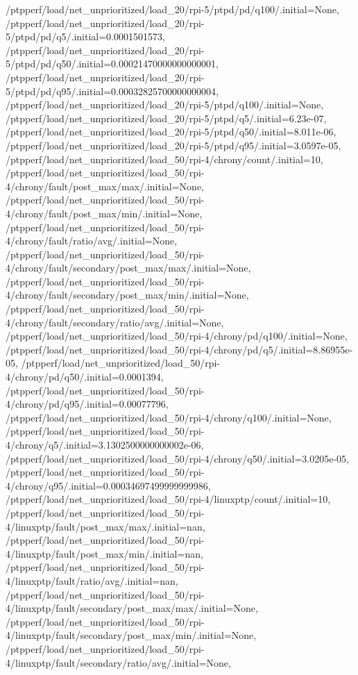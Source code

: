 {    /ptpperf/load/net_unprioritized/load_20/rpi-5/ptpd/pd/q100/.initial=None,
    /ptpperf/load/net_unprioritized/load_20/rpi-5/ptpd/pd/q5/.initial=0.0001501573,
    /ptpperf/load/net_unprioritized/load_20/rpi-5/ptpd/pd/q50/.initial=0.00021470000000000001,
    /ptpperf/load/net_unprioritized/load_20/rpi-5/ptpd/pd/q95/.initial=0.00032825700000000004,
    /ptpperf/load/net_unprioritized/load_20/rpi-5/ptpd/q100/.initial=None,
    /ptpperf/load/net_unprioritized/load_20/rpi-5/ptpd/q5/.initial=6.23e-07,
    /ptpperf/load/net_unprioritized/load_20/rpi-5/ptpd/q50/.initial=8.011e-06,
    /ptpperf/load/net_unprioritized/load_20/rpi-5/ptpd/q95/.initial=3.0597e-05,
    /ptpperf/load/net_unprioritized/load_50/rpi-4/chrony/count/.initial=10,
    /ptpperf/load/net_unprioritized/load_50/rpi-4/chrony/fault/post_max/max/.initial=None,
    /ptpperf/load/net_unprioritized/load_50/rpi-4/chrony/fault/post_max/min/.initial=None,
    /ptpperf/load/net_unprioritized/load_50/rpi-4/chrony/fault/ratio/avg/.initial=None,
    /ptpperf/load/net_unprioritized/load_50/rpi-4/chrony/fault/secondary/post_max/max/.initial=None,
    /ptpperf/load/net_unprioritized/load_50/rpi-4/chrony/fault/secondary/post_max/min/.initial=None,
    /ptpperf/load/net_unprioritized/load_50/rpi-4/chrony/fault/secondary/ratio/avg/.initial=None,
    /ptpperf/load/net_unprioritized/load_50/rpi-4/chrony/pd/q100/.initial=None,
    /ptpperf/load/net_unprioritized/load_50/rpi-4/chrony/pd/q5/.initial=8.86955e-05,
    /ptpperf/load/net_unprioritized/load_50/rpi-4/chrony/pd/q50/.initial=0.0001394,
    /ptpperf/load/net_unprioritized/load_50/rpi-4/chrony/pd/q95/.initial=0.00077796,
    /ptpperf/load/net_unprioritized/load_50/rpi-4/chrony/q100/.initial=None,
    /ptpperf/load/net_unprioritized/load_50/rpi-4/chrony/q5/.initial=3.1302500000000002e-06,
    /ptpperf/load/net_unprioritized/load_50/rpi-4/chrony/q50/.initial=3.0205e-05,
    /ptpperf/load/net_unprioritized/load_50/rpi-4/chrony/q95/.initial=0.00034697499999999986,
    /ptpperf/load/net_unprioritized/load_50/rpi-4/linuxptp/count/.initial=10,
    /ptpperf/load/net_unprioritized/load_50/rpi-4/linuxptp/fault/post_max/max/.initial=nan,
    /ptpperf/load/net_unprioritized/load_50/rpi-4/linuxptp/fault/post_max/min/.initial=nan,
    /ptpperf/load/net_unprioritized/load_50/rpi-4/linuxptp/fault/ratio/avg/.initial=nan,
    /ptpperf/load/net_unprioritized/load_50/rpi-4/linuxptp/fault/secondary/post_max/max/.initial=None,
    /ptpperf/load/net_unprioritized/load_50/rpi-4/linuxptp/fault/secondary/post_max/min/.initial=None,
    /ptpperf/load/net_unprioritized/load_50/rpi-4/linuxptp/fault/secondary/ratio/avg/.initial=None,
}
